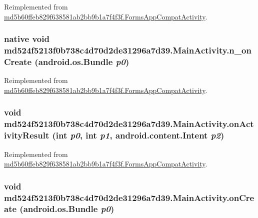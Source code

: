 Reimplemented from \hyperlink{classmd5b60ffeb829f638581ab2bb9b1a7f4f3f_1_1_forms_app_compat_activity_9a3a9d2f993a2d3b98d65006ed85bd7c}{md5b60ffeb829f638581ab2bb9b1a7f4f3f.FormsAppCompatActivity}.\hypertarget{classmd524f5213f0b738c4d70d2de31296a7d39_1_1_main_activity_9dfe7db08412a7c918b87ddeac611a44}{
\subsubsection[{n\_\-onCreate}]{\setlength{\rightskip}{0pt plus 5cm}native void md524f5213f0b738c4d70d2de31296a7d39.MainActivity.n\_\-onCreate (android.os.Bundle {\em p0})}}
\label{classmd524f5213f0b738c4d70d2de31296a7d39_1_1_main_activity_9dfe7db08412a7c918b87ddeac611a44}




Reimplemented from \hyperlink{classmd5b60ffeb829f638581ab2bb9b1a7f4f3f_1_1_forms_app_compat_activity_6bc254edf45b4b316595aac2cc544b5e}{md5b60ffeb829f638581ab2bb9b1a7f4f3f.FormsAppCompatActivity}.\hypertarget{classmd524f5213f0b738c4d70d2de31296a7d39_1_1_main_activity_36576989c07e54a702c70fb7649638cd}{
\subsubsection[{onActivityResult}]{\setlength{\rightskip}{0pt plus 5cm}void md524f5213f0b738c4d70d2de31296a7d39.MainActivity.onActivityResult (int {\em p0}, \/  int {\em p1}, \/  android.content.Intent {\em p2})}}
\label{classmd524f5213f0b738c4d70d2de31296a7d39_1_1_main_activity_36576989c07e54a702c70fb7649638cd}




Reimplemented from \hyperlink{classmd5b60ffeb829f638581ab2bb9b1a7f4f3f_1_1_forms_app_compat_activity_f329e41b3d57d0e505dd932a5d073788}{md5b60ffeb829f638581ab2bb9b1a7f4f3f.FormsAppCompatActivity}.\hypertarget{classmd524f5213f0b738c4d70d2de31296a7d39_1_1_main_activity_94ab3f430f87543996addad12cb41fda}{
\subsubsection[{onCreate}]{\setlength{\rightskip}{0pt plus 5cm}void md524f5213f0b738c4d70d2de31296a7d39.MainActivity.onCreate (android.os.Bundle {\em p0})}}
\label{classmd524f5213f0b738c4d70d2de31296a7d39_1_1_main_activity_94ab3f430f87543996addad12cb41fda}




